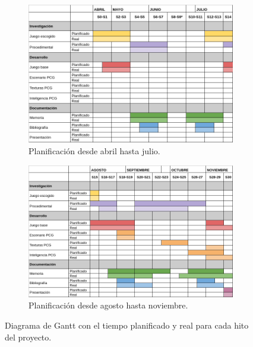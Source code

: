     \begin{figure}[H]
    \begin{center}
        \begin{subfigure}[b]{0.95\textwidth}
            \includegraphics[width=\textwidth]{img/gantt-A.PNG}
            \caption{Planificación desde abril hasta julio.}
        \end{subfigure}
        \par\bigskip
        \begin{subfigure}[b]{0.95\textwidth}
            \includegraphics[width=\textwidth]{img/gantt-B.PNG}
            \caption{Planificación desde agosto hasta noviembre.}
        \end{subfigure}
        \caption{Diagrama de Gantt con el tiempo planificado y real para cada hito del proyecto.}
    \end{center}
\end{figure}
    

